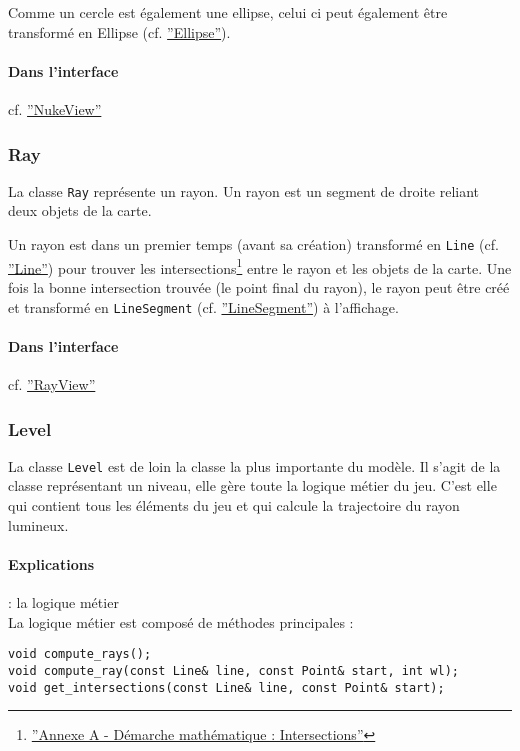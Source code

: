 \documentclass[]{article}
\begin{document}
Comme un cercle est également une ellipse, celui ci peut également être transformé en Ellipse (cf. \hyperref[Ellipse]{''Ellipse''}).

\paragraph{Dans l'interface} cf. \hyperref[NukeView]{''NukeView''}

\subsubsection{\label{Ray}Ray}

La classe \texttt{Ray} représente un rayon. Un rayon est un segment de droite reliant
deux objets de la carte. 

Un rayon est dans un premier temps (avant sa création) transformé en \texttt{Line} (cf. \hyperref[Line]{''Line''}) pour
trouver les intersections\footnote{\hyperref[AnnexeIntersects]{''Annexe A - Démarche mathématique : Intersections''}} entre le rayon et les objets de la carte. Une fois la bonne intersection trouvée (le point final du rayon), le rayon peut être créé et 
transformé en \texttt{LineSegment} (cf. \hyperref[LineSegment]{''LineSegment''}) à l'affichage.

\paragraph{Dans l'interface} cf. \hyperref[RayView]{''RayView''}

\newpage
\subsubsection{\label{Level}Level}

La classe \texttt{Level} est de loin la classe la plus importante du modèle.
Il s'agit de la classe représentant un niveau, elle gère toute la logique métier
du jeu. C'est elle qui contient tous les éléments du jeu et qui calcule
la trajectoire du rayon lumineux.

\paragraph{Explications} : la logique métier \\

La logique métier est composé de méthodes principales : 

\begin{lstlisting}
void compute_rays();
void compute_ray(const Line& line, const Point& start, int wl);
void get_intersections(const Line& line, const Point& start);
\end{lstlisting}
\end{document}
